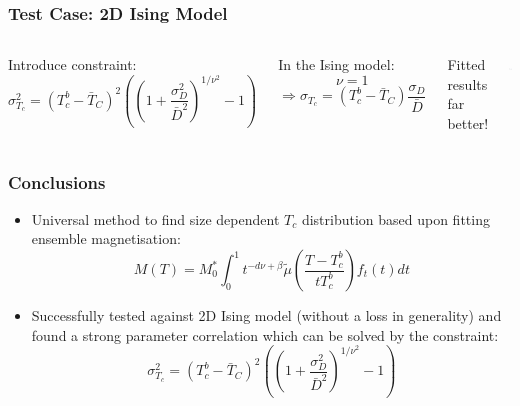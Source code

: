 \documentclass{beamer}
\begin{document}
\begin{frame}
	\frametitle{Test Case: 2D Ising Model}
	\begin{columns}
	\column{7cm}
		Introduce constraint\footnotemark[5]:
		$$
		\sigma_{T_c}^2 = (T_c^b - \bar{T}_C)^2\left(\left(1 + \frac{\sigma_D^2}{\bar{D}^2}\right)^{1/\nu^2}-1\right)
		$$

		In the Ising model:
		$$
		\nu = 1
		$$
		$$
		\Rightarrow \sigma_{T_c} = (T_c^b - \bar{T}_C)\frac{\sigma_D}{\bar{D}}
		$$
		\begin{center}\vspace{2mm}

		Fitted results far better!
		\end{center}
	\column{5cm}

		\includegraphics[width=4.5cm]{Images/constr}
	\end{columns}
\end{frame}

\begin{frame}
	\frametitle{Conclusions}
	\small{
	\begin{itemize}
		\item{Universal method to find size dependent $T_c$ distribution based upon fitting ensemble magnetisation:}
		$$
		M(T) = M_0^*\int_0^1 t^{-d\nu +\beta} \tilde{\mu}\left(\frac{T-T_c^b}{tT_c^b}\right) f_t(t) dt
		$$
		\item{Successfully tested against 2D Ising model (without a loss in generality) and found a strong parameter correlation which can be solved by the constraint:}
		$$
		\sigma_{T_c}^2 = (T_c^b - \bar{T}_C)^2\left(\left(1 + \frac{\sigma_D^2}{\bar{D}^2}\right)^{1/\nu^2}-1\right)
		$$
	\end{itemize}}
\end{frame}
\end{document}
